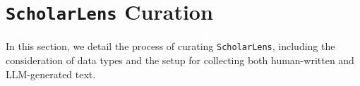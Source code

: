 

\section{\texttt{ScholarLens} Curation}
\label{sec: ScholarLens}

In this section, we detail the process of curating \texttt{ScholarLens}, including the consideration of data types and the setup for collecting both human-written and LLM-generated text.











